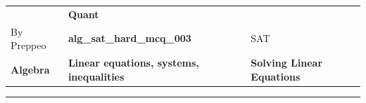 \documentclass[11pt,paper=a4,answers]{exam}
\begin{document}
\begin{center}
    \centering
    \renewcommand{\arraystretch}{1.5}
    \begin{tabularx}{\textwidth}{YYY}
    & \normalsize\bf{{\Large{{Quant}}}} & \\
    By Preppeo & \normalsize\bf{{alg\_sat\_hard\_mcq\_003}} & SAT\\
    \normalsize{{\textbf{{Algebra}} }} & \normalsize{{\textbf{{Linear equations, systems, inequalities }} }} & \normalsize{{\textbf{{Solving Linear Equations}} }} \\
    \end{tabularx}
\end{center}
\par\noindent\rule{\textwidth}{1pt}
\end{document}
